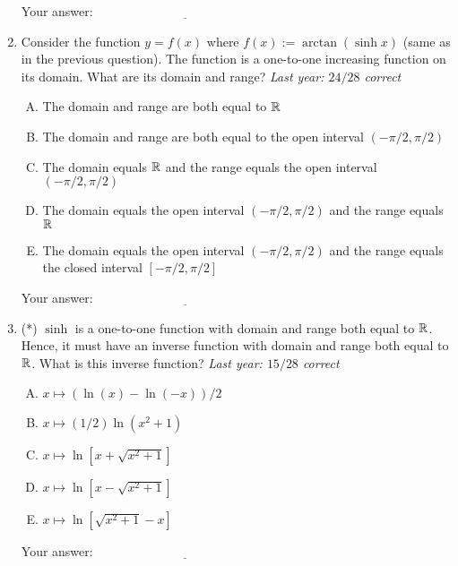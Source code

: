 \documentclass[10pt]{amsart}
\begin{document}
\begin{enumerate}
  \vspace{0.1in}
  Your answer: $\underline{\qquad\qquad\qquad\qquad\qquad\qquad\qquad}$
  \vspace{0.4in}

\item Consider the function $y = f(x)$ where $f(x) := \arctan(\sinh
  x)$ (same as in the previous question). The function is a one-to-one
  increasing function on its domain. What are its domain and range?
  {\em Last year: $24/28$ correct}

  \begin{enumerate}[(A)]
  \item The domain and range are both equal to $\mathbb{R}$
  \item The domain and range are both equal to the open interval
    $(-\pi/2,\pi/2)$
  \item The domain equals $\mathbb{R}$ and the range equals the open interval
    $(-\pi/2,\pi/2)$
  \item The domain equals the open interval $(-\pi/2,\pi/2)$ and the range
    equals $\mathbb{R}$
  \item The domain equals the open interval $(-\pi/2,\pi/2)$ and the
    range equals the closed interval $[-\pi/2,\pi/2]$
  \end{enumerate}

  \vspace{0.1in}
  Your answer: $\underline{\qquad\qquad\qquad\qquad\qquad\qquad\qquad}$
  \vspace{0.4in}

\item (*) $\sinh$ is a one-to-one function with domain and range both
  equal to $\mathbb{R}$. Hence, it must have an inverse function with domain
  and range both equal to $\mathbb{R}$. What is this inverse function? {\em
  Last year: $15/28$ correct}

  \begin{enumerate}[(A)]
  \item $x \mapsto (\ln(x) - \ln(-x))/2$
  \item $x \mapsto (1/2)\ln(x^2 + 1)$
  \item $x \mapsto \ln[x + \sqrt{x^2 + 1}]$
  \item $x \mapsto \ln[x - \sqrt{x^2 + 1}]$
  \item $x \mapsto \ln[\sqrt{x^2 + 1} - x]$
  \end{enumerate}

  \vspace{0.1in}
  Your answer: $\underline{\qquad\qquad\qquad\qquad\qquad\qquad\qquad}$
  \vspace{0.4in}
\end{enumerate}
\end{document}
